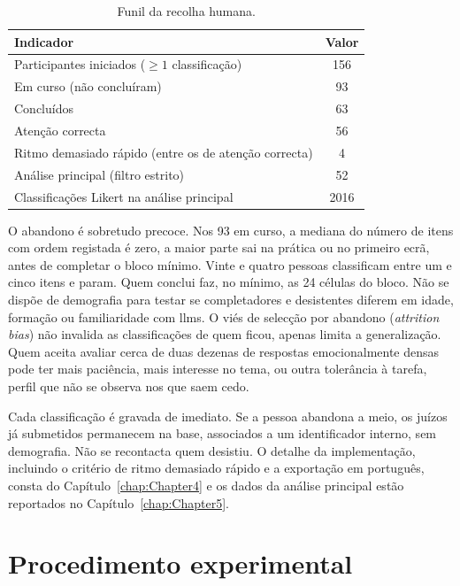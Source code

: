 \begin{table}[ht]
\centering
\caption{Funil da recolha humana.}
\label{tab:funil_abandono}
\begin{tabular}{lc}
\hline
Indicador & Valor \\
\hline
Participantes iniciados (\(\ge 1\) classificação) & 156 \\
Em curso (não concluíram) & 93 \\
Concluídos & 63 \\
Atenção correcta & 56 \\
Ritmo demasiado rápido (entre os de atenção correcta) & 4 \\
Análise principal (filtro estrito) & 52 \\
Classificações Likert na análise principal & 2016 \\
\hline
\end{tabular}
\end{table}

O abandono é sobretudo precoce. Nos 93 em curso, a mediana do número de itens com ordem registada é zero, a maior parte sai na prática ou no primeiro ecrã, antes de completar o bloco mínimo. Vinte e quatro pessoas classificam entre um e cinco itens e param. Quem conclui faz, no mínimo, as 24 células do bloco. Não se dispõe de demografia para testar se completadores e desistentes diferem em idade, formação ou familiaridade com \glspl{llm}. O viés de selecção por abandono (\textit{attrition bias}) não invalida as classificações de quem ficou, apenas limita a generalização. Quem aceita avaliar cerca de duas dezenas de respostas emocionalmente densas pode ter mais paciência, mais interesse no tema, ou outra tolerância à tarefa, perfil que não se observa nos que saem cedo.

Cada classificação é gravada de imediato. Se a pessoa abandona a meio, os juízos já submetidos permanecem na base, associados a um identificador interno, sem demografia. Não se recontacta quem desistiu. O detalhe da implementação, incluindo o critério de ritmo demasiado rápido e a exportação em português, consta do Capítulo~\ref{chap:Chapter4} e os dados da análise principal estão reportados no Capítulo~\ref{chap:Chapter5}.


\section{Procedimento experimental}
\label{sec:procedimento}

